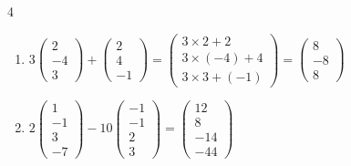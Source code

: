 {\begin{multicols}{4}
\begin{enumerate}
		\item
		$3\begin{pmatrix}2\\-4\\3\end{pmatrix} + \begin{pmatrix}2\\4\\-1\end{pmatrix} = \begin{pmatrix}3\times2+2\\3\times(-4)+4\\3\times3+(-1)\end{pmatrix} =\begin{pmatrix}8\\-8\\8\end{pmatrix}$
		\item
		$2\begin{pmatrix} 1\\-1\\3\\-7\end{pmatrix} - 10\begin{pmatrix}-1\\-1\\2\\3\end{pmatrix} = \begin{pmatrix}12\\8\\-14\\-44\end{pmatrix}$
	\end{enumerate}
	\end{multicols}
}



